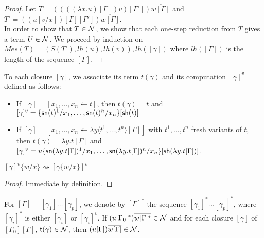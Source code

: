 \documentclass{llncs} %
\begin{document}
\begin{proof}
 Let $T = ((((\lambda x.u)[\Gamma]) v)[\Gamma'])\overline{w[\Gamma]}$ and $T' = ((u[v/x])[\Gamma][\Gamma'])\overline{w[\Gamma]}$.
\\
In order to show that $T\in\mathcal{N}$, we show that each one-step reduction from $T$ gives a term $U\in\mathcal{N}$.
%
We proceed by induction on $Mes(T) = (S(T'), lh(u), lh(v)), lh([\gamma])$ where
 $lh([\Gamma])$ is the length of the sequence $[\Gamma]$.
\end{proof}

\newcommand{\term}{{\mathsf{t}}}

To each closure $[\gamma]$, we associate its term $t(\gamma)$ and its computation $[\gamma]^v $ defined as follows:
\begin{itemize}
 \item If $[\gamma] = [x_1,\dots,x_n \leftarrow t]$, then $t(\gamma) = t$  and $[\gamma]^v = \{{\mathsf{sn}}(t)^1/x_1,\dots,{\mathsf{sn}}(t)^n/x_n\}[{\mathsf{sh}} (t)]$
 \item If $[\gamma] = [x_1,\dots,x_n \twoheadleftarrow \lambda y\langle t^1,\dots,t^n \rangle[\Gamma]]$ with $t^1,\dots,t^n$  fresh variants of $t$, then  $t(\gamma) = \lambda y.t[\Gamma]$  and $[\gamma]^v = u\{{\mathsf{sn}}(\lambda y.t[\Gamma])^1/x_1,\dots,{\mathsf{sn}}(\lambda y.t[\Gamma])^n/x_n\}[{\mathsf{sh}} (\lambda y.t[\Gamma])]$.
\end{itemize}

\begin{lemma}\label{lem:CompSubst}
 $[\gamma]^v \{w/x\} \rightsquigarrow [\gamma\{w/x\} ]^v$
\end{lemma}

\begin{proof}
Immediate by definition.
\end{proof}

\begin{lemma}\label{lem:IntCaseSharing0}
For $[\Gamma] = [\gamma_1] \dots[\gamma_p]$, we denote by $[\Gamma]^*$ the sequence $[\gamma_1]^* \dots[\gamma_p]^*$, where $[\gamma_i]^*$ is either $[\gamma_i]$ or $[\gamma_i]^v$.
 If $(u[\Gamma_0]^*)\overline{w[\Gamma]^*} \in \mathcal{N}$ and for each closure $[\gamma]$ of $[\Gamma_0]\overline{[\Gamma]}$,  $\term (\gamma)\in\SN$, then $(u[\Gamma])\overline{w[\Gamma]} \in \mathcal{N}$.
\end{lemma}
\end{document}
